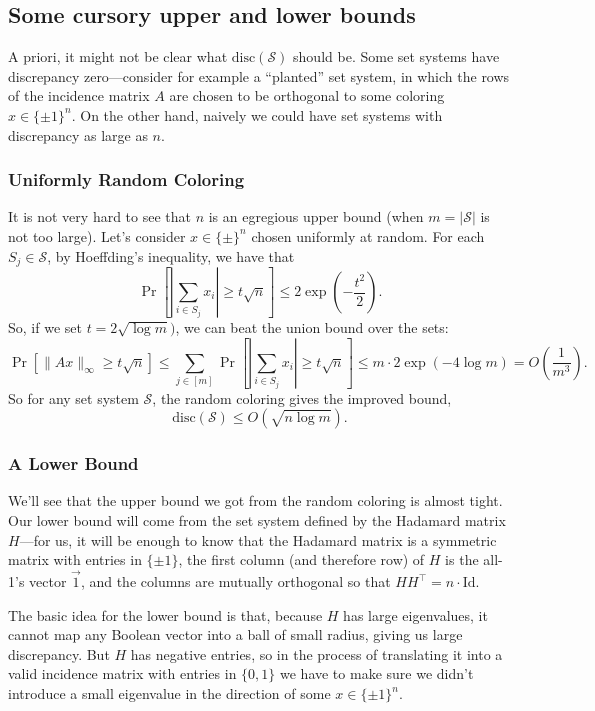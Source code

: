 \documentclass{article}
\theoremstyle{theorem}
\theoremstyle{definition}
\newcommand{\disc}{\mathrm{disc}}
\newcommand{\cS}{\mathcal{S}}
\newcommand{\Id}{\mathrm{Id}}
\begin{document}
\subsection*{Some cursory upper and lower bounds}
A priori, it might not be clear what $\disc(\cS)$ should be.
Some set systems have discrepancy zero---consider for example a ``planted'' set system, in which the rows of the incidence matrix $A$ are chosen to be orthogonal to some coloring $x\in \{\pm 1\}^n$.
On the other hand, naively we could have set systems with discrepancy as large as $n$.

\subsubsection*{Uniformly Random Coloring}
It is not very hard to see that $n$ is an egregious upper bound (when $m = |\cS|$ is not too large).
Let's consider $x \in \{\pm\}^n$ chosen uniformly at random.
For each $S_j \in \cS$, by Hoeffding's inequality, we have that
\[
    \Pr\left[\left|\sum_{i \in S_j} x_i \right| \ge t \sqrt{n} \right] \le 2\exp\left(-\frac{t^2}{2}\right).
\]
So, if we set $t = 2\sqrt{\log m})$, we can beat the union bound over the sets:
\[
    \Pr[\|Ax\|_{\infty} \ge t\sqrt{n}]
    \le \sum_{j \in [m]} \Pr\left[\left|\sum_{i \in S_j} x_i \right| \ge t\sqrt{n} \right]
    \le m \cdot 2\exp(-4 \log m) = O\left(\frac{1}{m^3}\right).
\]
So for any set system $\cS$, the random coloring gives the improved bound,
\begin{equation}
    \disc(\cS) \le O(\sqrt{n\log m}).\label{randomub}
\end{equation}

\subsubsection*{A Lower Bound}
We'll see that the upper bound we got from the random coloring is almost tight.
Our lower bound will come from the set system defined by the
Hadamard matrix %
 $H$---for us, it will be enough to know that the Hadamard matrix is a symmetric matrix with entries in $\{\pm 1\}$,  the first column (and therefore row) of $H$ is the all-1's vector $\vec{1}$, and the columns are mutually orthogonal so that $HH^{\top} = n\cdot \Id$.

The basic idea for the lower bound is that, because $H$ has large eigenvalues, it cannot map any Boolean vector into a ball of small radius, giving us large discrepancy.
But $H$ has negative entries, so in the process of translating it into a valid incidence matrix with entries in $\{0,1\}$ we have to make sure we didn't introduce a small eigenvalue in the direction of some $x \in \{\pm 1\}^n$.
\end{document}
